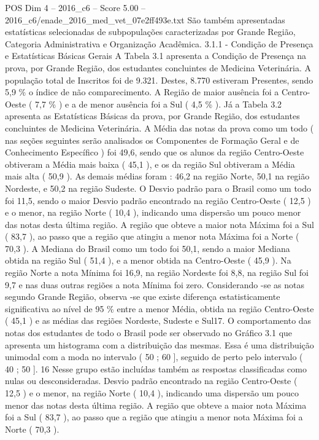 \begin{textsample}{POS Dim 4 – 2016\_c6 – Score 5.00 – 2016\_c6/enade\_2016\_med\_vet\_07e2ff493e.txt}
São também apresentadas estatísticas selecionadas de subpopulações caracterizadas por Grande Região, Categoria Administrativa e Organização Acadêmica. 3.1.1 - Condição de Presença e Estatísticas Básicas Gerais A Tabela 3.1 apresenta a Condição de Presença na prova, por Grande Região, dos estudantes concluintes de Medicina Veterinária.
A população total de Inscritos foi de 9.321.
Destes, 8.770 estiveram Presentes, sendo 5,9 \% o índice de não comparecimento.
A Região de maior ausência foi a Centro-Oeste ( 7,7 \% ) e a de menor ausência foi a Sul ( 4,5 \% ).
Já a Tabela 3.2 apresenta as Estatísticas Básicas da prova, por Grande Região, dos estudantes concluintes de Medicina Veterinária.
A Média das notas da prova como um todo ( nas seções seguintes serão analisados os Componentes de Formação Geral e de Conhecimento Específico ) foi 49,6, sendo que os alunos da região Centro-Oeste obtiveram a Média mais baixa ( 45,1 ), e os da região Sul obtiveram a Média mais alta ( 50,9 ).
As demais médias foram : 46,2 na região Norte, 50,1 na região Nordeste, e 50,2 na região Sudeste.
O Desvio padrão para o Brasil como um todo foi 11,5, sendo o maior Desvio padrão encontrado na região Centro-Oeste ( 12,5 ) e o menor, na região Norte ( 10,4 ), indicando uma dispersão um pouco menor das notas desta última região.
A região que obteve a maior nota Máxima foi a Sul ( 83,7 ), ao passo que a região que atingiu a menor nota Máxima foi a Norte ( 70,3 ).
A Mediana do Brasil como um todo foi 50,1, sendo a maior Mediana obtida na região Sul ( 51,4 ), e a menor obtida na Centro-Oeste ( 45,9 ).
Na região Norte a nota Mínima foi 16,9, na região Nordeste foi 8,8, na região Sul foi 9,7 e nas duas outras regiões a nota Mínima foi zero.
Considerando -se as notas segundo Grande Região, observa -se que existe diferença estatisticamente significativa ao nível de 95 \% entre a menor Média, obtida na região Centro-Oeste ( 45,1 ) e as médias das regiões Nordeste, Sudeste e Sul17.
O comportamento das notas dos estudantes de todo o Brasil pode ser observado no Gráfico 3.1 que apresenta um histograma com a distribuição das mesmas.
Essa é uma distribuição unimodal com a moda no intervalo ( 50 ; 60 ], seguido de perto pelo intervalo ( 40 ; 50 ]. 16 Nesse grupo estão incluídas também as respostas classificadas como nulas ou desconsideradas.
Desvio padrão encontrado na região Centro-Oeste ( 12,5 ) e o menor, na região Norte ( 10,4 ), indicando uma dispersão um pouco menor das notas desta última região.
A região que obteve a maior nota Máxima foi a Sul ( 83,7 ), ao passo que a região que atingiu a menor nota Máxima foi a Norte ( 70,3 ).

\end{textsample}
